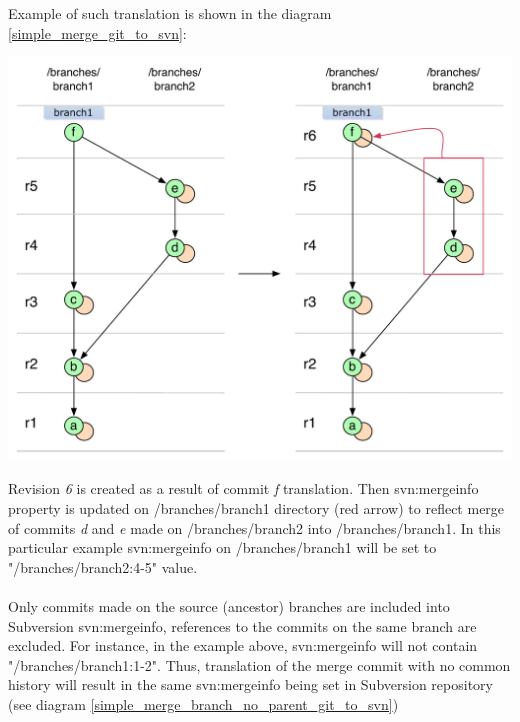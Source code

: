 Example of such translation is shown in the diagram \ref{simple_merge_git_to_svn}:

\begin{center}
\includegraphics[width=\textwidth]{img/diagrams/simple_merge_git_to_svn.pdf}%
\label{simple_merge_git_to_svn}%
\end{center}

Revision \emph{6} is created as a result of commit \emph{f} translation. Then svn:mergeinfo property is updated on /branches/branch1 directory
(red arrow) to reflect merge of commits \emph{d} and \emph{e} made on /branches/branch2 into /branches/branch1. In this 
particular example svn:mergeinfo on /branches/branch1 will be set to "/branches/branch2:4-5" value.
\\\\
Only commits made on the source (ancestor) branches are included into Subversion svn:mergeinfo, references to the commits on the same branch
are excluded. For instance, in the example above, svn:mergeinfo will not contain "/branches/branch1:1-2". Thus, translation of the merge commit with no common history will result in the same svn:mergeinfo being set in Subversion repository (see diagram \ref{simple_merge_branch_no_parent_git_to_svn})

